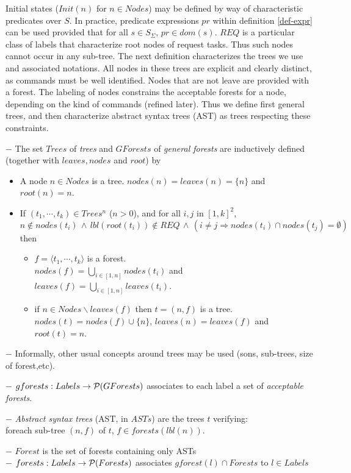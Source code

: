 \documentclass{article}
\begin{document}
Initial states ($Init(n)$ for $n\in Nodes$) may be defined by way of characteristic predicates over $S$. In practice, predicate expressions $pr$ within definition \ref{def-expr} can be used provided that for all $s\in S_\Sigma$, $pr\in dom(s)$. $REQ$ is a particular class of labels that characterize root nodes of request tasks. Thus such nodes cannot occur in any sub-tree. The next definition characterizes the trees we use and associated notations. All nodes in these trees are explicit and clearly distinct, as commands must be well identified. Nodes that are not leave are provided with a forest. The labeling of nodes constrains the acceptable forests for a node, depending on the kind of commands (refined later). Thus we define first general trees, and then characterize abstract syntax trees (AST) as trees respecting these constraints. 
\begin{definition}\label{def-ast} $-$ The set $Trees$ of {\em trees} and $GForests$ of {\em general forests} are inducti\-vely defined (together with $leaves, nodes$ and $root$) by
\begin{itemize}
\item A node $n\in Nodes$ is a tree. $nodes(n)=leaves(n)=\{n\}$ and $root(n)=n$.
\item If $(t_1,\cdots,t_k)\in Trees^n$ ($n>0$), and for all $i,j$ in $[1,k]^2$,\\
$n\notin nodes(t_i)\,\wedge\, lbl(root(t_i))\notin REQ\,\wedge \, (i\neq j\Rightarrow nodes(t_i)\cap nodes(t_j)=\emptyset)$ then
  \begin{itemize}
  \item  $f=\langle t_1,\cdots,t_k \rangle$ is a forest.\\ $nodes(f)=\bigcup_{i\in[1,n]}nodes(t_i)$ and $leaves(f)=\bigcup_{i\in[1,n]}leaves(t_i)$.
  \item if $n\in Nodes\backslash leaves(f)$ then $t=(n,f)$ is a tree.\\
	$nodes(t)=nodes(f)\cup\{n\}$, $leaves(n)=leaves(f)$ and $root(t)=n$.
	\end{itemize}
\end{itemize}
$-$ Informally, other usual concepts around trees may be used (sons, sub-trees, size of forest,etc). 

$-$ $gforests: Labels\rightarrow{\cal P}(GForests)$ associates to each label a set of {\em acceptable forests}.

$-$ {\em Abstract syntax trees} (AST, in $AST\!s$) are the trees $t$ verifying:\\ \hspace*{3mm} foreach sub-tree $(n,f)$ of $t$, $f\in forests(lbl(n))$.

$-$ $Forest$ is the set of forests containing only ASTs\\
$-$ $forests: Labels\rightarrow{\cal P}(Forests)$ associates $gforest(l)\cap Forests$ to $l\in Labels$ 
\end{definition}
\end{document}
